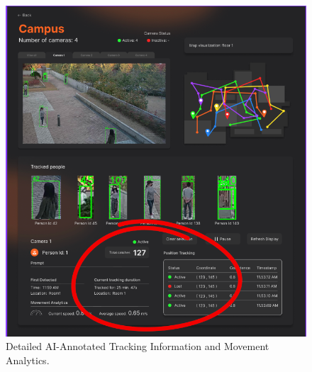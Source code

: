\begin{figure}[H]
    \centering
    \includegraphics[width=1.0\textwidth,keepaspectratio]{assets/jubjones/ai_mockup_data.png}
    \caption{Detailed AI-Annotated Tracking Information and Movement Analytics.}
    \label{fig:ai_mockup_data}
\end{figure}

